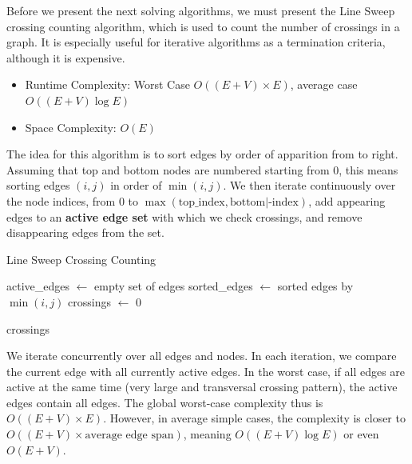 \documentclass[a4paper]{article}
\begin{document}
Before we present the next solving algorithms, we must present the Line Sweep crossing counting algorithm, which is used to count the number of crossings in a graph. It is especially useful for iterative algorithms as a termination criteria, although it is expensive.\\

\begin{itemize}
	\item Runtime Complexity: Worst Case $O((E + V) \times E)$, average case $O((E + V) \log E)$
	\item Space Complexity: $O(E)$\\
\end{itemize}

The idea for this algorithm is to sort edges by order of apparition from to right.
Assuming that top and bottom nodes are numbered starting from 0, this means sorting edges $(i, j)$ in order of $\min(i, j)$.
We then iterate continuously over the node indices, from 0 to $\max(\text{top\_index}, \text{bottom|-index})$, add appearing edges to an \textbf{active edge set} with which we check crossings, and remove disappearing edges from the set.\\


\begin{algorithm}[H]
	\caption{Line Sweep Crossing Counting}
	\DontPrintSemicolon
	\BlankLine

	active\_edges $\gets$ empty set of edges\;
	sorted\_edges $\gets$ sorted edges by $\min(i, j)$\;
	crossings $\gets$ 0\;
	\BlankLine


	\Return crossings\;
\end{algorithm}

We iterate concurrently over all edges and nodes. In each iteration, we compare the current edge with all currently active edges.
In the worst case, if all edges are active at the same time (very large and transversal crossing pattern), the active edges contain all edges.
The global worst-case complexity thus is $O((E + V) \times E)$. However, in average simple cases, the complexity is closer to $O((E + V) \times \text{average edge span})$, meaning $O((E + V) \log E)$ or even $O(E + V)$.
\end{document}
